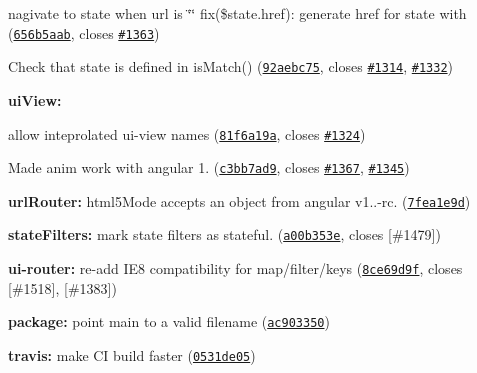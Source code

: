 {{{{\begin{DoxyItemize}
\begin{DoxyItemize}
\item nagivate to state when url is \char`\"{}\char`\"{} fix(\$state.\+href)\+: generate href for state with (\href{https://github.com/angular-ui/ui-router/commit/656b5aab906e5749db9b5a080c6a83b95f50fd91}{\tt 656b5aab}, closes \href{https://github.com/angular-ui/ui-router/issues/1363}{\tt \#1363})
\item Check that state is defined in is\+Match() (\href{https://github.com/angular-ui/ui-router/commit/92aebc7520f88babdc6e266536086e07263514c3}{\tt 92aebc75}, closes \href{https://github.com/angular-ui/ui-router/issues/1314}{\tt \#1314}, \href{https://github.com/angular-ui/ui-router/issues/1332}{\tt \#1332})
\end{DoxyItemize}
\item {\bfseries ui\+View\+:}
\begin{DoxyItemize}
\item allow inteprolated ui-\/view names (\href{https://github.com/angular-ui/ui-router/commit/81f6a19a432dac9198fd33243855bfd3b4fea8c0}{\tt 81f6a19a}, closes \href{https://github.com/angular-ui/ui-router/issues/1324}{\tt \#1324})
\item Made anim work with angular 1. (\href{https://github.com/angular-ui/ui-router/commit/c3bb7ad903da1e1f3c91019cfd255be8489ff4ef}{\tt c3bb7ad9}, closes \href{https://github.com/angular-ui/ui-router/issues/1367}{\tt \#1367}, \href{https://github.com/angular-ui/ui-router/issues/1345}{\tt \#1345})
\end{DoxyItemize}
\item {\bfseries url\+Router\+:} html5\+Mode accepts an object from angular v1..-\/rc. (\href{https://github.com/angular-ui/ui-router/commit/7fea1e9d0d8c6e09cc6c895ecb93d4221e9adf48}{\tt 7fea1e9d})
\item {\bfseries state\+Filters\+:} mark state filters as stateful. (\href{https://github.com/angular-ui/ui-router/commit/a00b353e3036f64a81245c4e7898646ba218f833}{\tt a00b353e}, closes \mbox{[}\#1479\mbox{]})
\item {\bfseries ui-\/router\+:} re-\/add I\+E8 compatibility for map/filter/keys (\href{https://github.com/angular-ui/ui-router/commit/8ce69d9f7c886888ab53eca7e53536f36b428aae}{\tt 8ce69d9f}, closes \mbox{[}\#1518\mbox{]}, \mbox{[}\#1383\mbox{]})
\item {\bfseries package\+:} point \textquotesingle{}main\textquotesingle{} to a valid filename (\href{https://github.com/angular-ui/ui-router/commit/ac9033501debb63364539d91fbf3a0cba4579f8e}{\tt ac903350})
\item {\bfseries travis\+:} make CI build faster (\href{https://github.com/angular-ui/ui-router/commit/0531de052e414a8d839fbb4e7635e923e94865b3}{\tt 0531de05})
\end{DoxyItemize}}}}}

